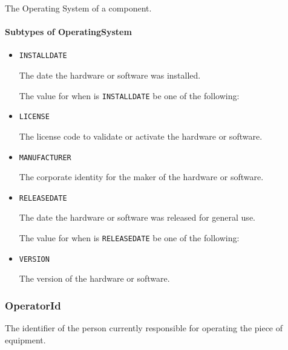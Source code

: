 The Operating System of a component.


\paragraph{Subtypes of OperatingSystem}\mbox{}
\label{sec:Subtypes of OperatingSystem}

\begin{itemize}

\item \texttt{INSTALL\textunderscore DATE}


The date the hardware or software was installed.


The value for  when  is \texttt{INSTALL\textunderscore DATE} \MUST be one of the following: 

\item \texttt{LICENSE}


The license code to validate or activate the hardware or software.

\item \texttt{MANUFACTURER}


The corporate identity for the maker of the hardware or software.


\item \texttt{RELEASE\textunderscore DATE}


The date the hardware or software was released for general use.



The value for  when  is \texttt{RELEASE\textunderscore DATE} \MUST be one of the following: 

\item \texttt{VERSION}


The version of the hardware or software.


\end{itemize}








\subsubsection{OperatorId}
\label{sec:OperatorId}



The identifier of the person currently responsible for operating the piece of equipment.



